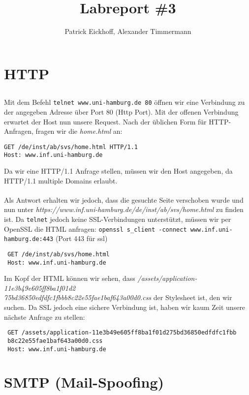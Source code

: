 \documentclass{scrartcl}
\author{Patrick Eickhoff, Alexander Timmermann}
\title{Labreport \#3}
\date{}
\begin{document}
    \maketitle
    \section{HTTP}
    \label{sec:HTTP}

      \subsection{}
      \label{sub:1.1}
        Mit dem Befehl \texttt{telnet www.uni-hamburg.de 80} öffnen wir eine
        Verbindung zu der angegeben Adresse über Port 80 (Http Port).
        Mit der offenen Verbindung erwartet der Host nun unsere Request.
        Nach der üblichen Form für HTTP-Anfragen, fragen wir die
        \textit{home.html} an:
        \begin{lstlisting}
GET /de/inst/ab/svs/home.html HTTP/1.1
Host: www.inf.uni-hamburg.de
        \end{lstlisting}
        Da wir eine HTTP/1.1 Anfrage stellen, müssen wir den Host angegeben,
        da HTTP/1.1 multiple Domains erlaubt.\\\\
        Als Antwort erhalten wir jedoch, dass die gesuchte Seite verschoben
        wurde und nun unter
        \textit{https://www.inf.uni-hamburg.de/de/inst/ab/svs/home.html}
        zu finden ist. Da \texttt{telnet} jedoch keine SSL-Verbindungen
        unterstützt, müssen wir per OpenSSL die HTML anfragen:
        \texttt{openssl s\_client -connect www.inf.uni-hamburg.de:443} (Port 443
        für ssl)
        \begin{lstlisting}
 GET /de/inst/ab/svs/home.html
 Host: www.inf.uni-hamburg.de
        \end{lstlisting}
        Im Kopf der HTML können wir sehen, dass
        \textit{/assets/application-11e3b49e605ff8ba1f01d2\\
                75bd36850edfdfc1fbbb8c22e55fae1baf643a00d0.css}
        der Stylesheet ist, den wir suchen. Da SSL jedoch eine sichere Verbindung
        ist, haben wir kaum Zeit unsere nächste Anfrage zu stellen:
        \begin{lstlisting}
 GET /assets/application-11e3b49e605ff8ba1f01d275bd36850edfdfc1fbb
 b8c22e55fae1baf643a00d0.css
 Host: www.inf.uni-hamburg.de
        \end{lstlisting}
  \section{SMTP (Mail-Spoofing)}
  \label{sec:SMTP (Mail-Spoofing)}
\end{document}
